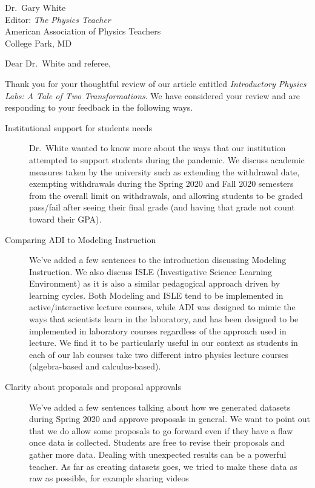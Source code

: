 \documentclass{letter}
\begin{document}
\begin{letter}{Dr.\ Gary White \\ Editor: \textit{The Physics Teacher} \\ American Association
    of Physics Teachers \\ College Park, MD}

  \opening{Dear Dr.\ White and referee,}

  Thank you for your thoughtful review of our article entitled \textit{Introductory Physics
    Labs: A Tale of Two Transformations}. We have considered your review and are responding to
  your feedback in the following ways.

  \begin{description}
    \item[Institutional support for students needs] Dr.\ White wanted to know more about the
    ways that our institution attempted to support students during the pandemic.  We discuss
    academic measures taken by the university such as extending the withdrawal date, exempting
    withdrawals during the Spring 2020 and Fall 2020 semesters from the overall limit on
    withdrawals, and allowing students to be graded pass/fail after seeing their final grade
    (and having that grade not count toward their GPA).
    \item[Comparing ADI to Modeling Instruction] We've added a few sentences to the
    introduction discussing Modeling Instruction.  We also discuss ISLE (Investigative Science
    Learning Environment) as it is also a similar pedagogical approach driven by learning
    cycles.  Both Modeling and ISLE tend to be implemented in active/interactive lecture
    courses, while ADI was designed to mimic the ways that scientists learn in the laboratory,
    and has been designed to be implemented in laboratory courses regardless of the approach
    used in lecture. We find it to be particularly useful in our context as students in each of
    our lab courses take two different intro physics lecture courses (algebra-based and
    calculus-based).
    \item[Clarity about proposals and proposal approvals] We've added a few sentences talking
    about how we generated datasets during Spring 2020 and approve proposals in general. We
    want to point out that we do allow some proposals to go forward even if they have a flaw
    once data is collected.  Students are free to revise their proposals and gather more
    data. Dealing with unexpected results can be a powerful teacher. As far as creating
    datasets goes, we tried to make these data as raw as possible, for example sharing videos

\end{description}
\end{letter}
\end{document}
